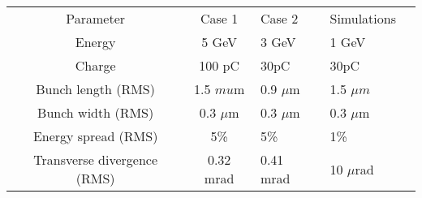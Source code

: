 \documentclass[%
 onecolumn,notitlepage,
 amsmath,amssymb,
 aps,
 longbibliography
]{revtex4-1}
\begin{document}
\begin{center}
\begin{minipage}[t]{0.7\textwidth}
\begin{table}[H]
\begin{ruledtabular}
\begin{tabular}{ccllc}
&\hspace{-12pt}{EuPRAXIA bunch parameters}\vspace{1pt} \\
\hline
Parameter&Case 1 &\hspace{-35pt} Case 2 & Simulations\\
\hline
Energy&5 GeV  &\hspace{-35pt} 3 GeV &1 GeV  \\
Charge&100 pC &\hspace{-35pt} 30pC& 30pC \\
Bunch length (RMS)& 1.5 $mu$m  &\hspace{-35pt}  0.9 $\mu$m &1.5 $\mu m$ \\
Bunch width (RMS)&0.3 $\mu$m & \hspace{-35pt} 0.3 $\mu$m&0.3 $\mu$m   \\
Energy spread (RMS)& 5\%& \hspace{-35pt} 5\%  &1\% \\
Transverse divergence (RMS) & 0.32 mrad  &  \hspace{-35pt} 0.41 mrad &10 $\mu$rad \\
\end{tabular}
\end{ruledtabular}
\end{table}
\end{minipage}
\end{center}
\end{document}
